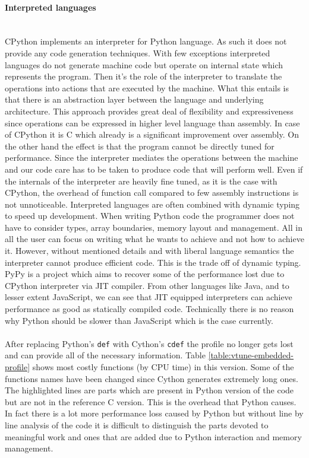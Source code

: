 \documentclass[12pt, a4paper]{report}
\newcommand{\myparagraph}[1]{\paragraph{#1}\mbox{}\\}
\begin{document}
\myparagraph{Interpreted languages}\label{para:interpret-lang}
CPython implements an interpreter for Python language. As such it does not provide
any code generation techniques. With few exceptions interpreted languages do not
generate machine code but operate on internal state which represents the program.
Then it's the role of the interpreter to translate the operations into actions
that are executed by the machine. What this entails is that there is an
abstraction layer between the language and underlying architecture. This
approach provides great deal of flexibility and expressiveness since operations
can be expressed in higher level language than assembly. In case of CPython it
is C which already is a significant improvement over assembly. On the other hand
the effect is that the program cannot be directly tuned for performance. Since
the interpreter mediates the operations between the machine and our code care
has to be taken to produce code that will perform well. Even if the internals
of the interpreter are heavily fine tuned, as it is the case with CPython, the
overhead of function call compared to few assembly instructions is not unnoticeable.
Interpreted languages are often combined with dynamic typing to speed up development.
When writing Python code the programmer does not have to consider types,
array boundaries, memory layout and management. All in all the user can focus
on writing what he wants to achieve and not how to achieve it. However, without
mentioned details and with liberal language semantics the interpreter cannot
produce efficient code. This is the trade off of dynamic typing. PyPy is a
project which aims to recover some of the performance lost due to CPython
interpreter via JIT compiler. From other languages like Java, and to lesser
extent JavaScript, we can see that JIT equipped interpreters can achieve performance
as good as statically compiled code. Technically there is no reason why Python
should be slower than JavaScript which is the case currently.
\\\\
After replacing Python's \lstinline{def} with Cython's \lstinline{cdef} the profile
no longer gets lost and can provide all of the necessary information. Table
\ref{table:vtune-embedded-profile} shows most costly functions (by CPU time)
in this version. Some of the functions names have been changed since Cython
generates extremely long ones. The highlighted lines are parts which are
present in Python version of the code but are not in the reference C version.
This is the overhead that Python causes. In fact there is a lot more performance
loss caused by Python but without line by line analysis of the code it is
difficult to distinguish the parts devoted to meaningful work and ones that
are added due to Python interaction and memory management.
\end{document}
